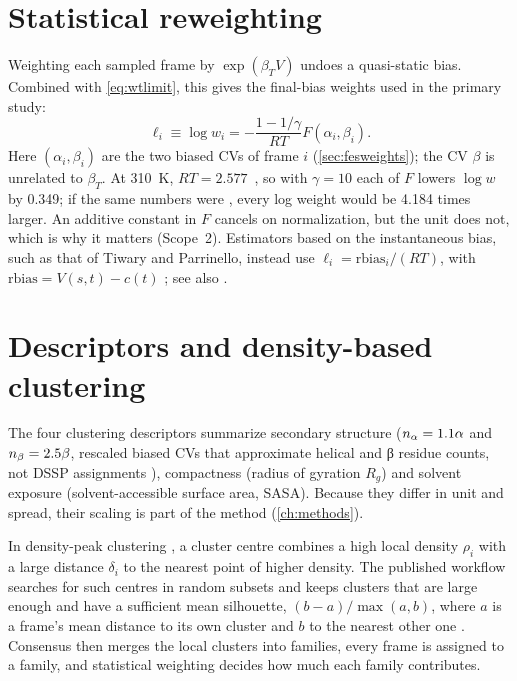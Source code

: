 \section{Statistical reweighting}
\label{sec:reweighting}
Weighting each sampled frame by $\exp(\beta_T V)$ undoes a quasi-static bias. Combined with \cref{eq:wtlimit}, this gives the final-bias weights used in the primary study:
\begin{equation}
\ell_i\equiv\log w_i=-\frac{1-1/\gamma}{RT}F(\alpha_i,\beta_i).
\label{eq:finalweights}
\end{equation}
Here $(\alpha_i,\beta_i)$ are the two biased CVs of frame $i$ (\cref{sec:fesweights}); the CV $\beta$ is unrelated to $\beta_T$. At 310~K, $RT=2.577$~\kJmol{}, so with $\gamma=10$ each \kJmol{} of $F$ lowers $\log w$ by 0.349; if the same numbers were \kcalmol{}, every log weight would be 4.184 times larger. An additive constant in $F$ cancels on normalization, but the unit does not, which is why it matters (Scope~2). Estimators based on the instantaneous bias, such as that of Tiwary and Parrinello, instead use $\ell_i=\mathrm{rbias}_i/(RT)$, with $\mathrm{rbias}=V(s,t)-c(t)$ \autocite{tiwary2015,plumedreweight}; see also \textcite{bonomi2009}.

\section{Descriptors and density-based clustering}
The four clustering descriptors summarize secondary structure ($n_{\alpha}=1.1\alpha$ and $n_{\beta}=2.5\beta$, rescaled biased CVs that approximate helical and β residue counts, not DSSP assignments \autocite{kabsch1983}), compactness (radius of gyration $R_g$) and solvent exposure (solvent-accessible surface area, SASA). Because they differ in unit and spread, their scaling is part of the method (\cref{ch:methods}).

In density-peak clustering \autocite{rodriguez2014}, a cluster centre combines a high local density $\rho_i$ with a large distance $\delta_i$ to the nearest point of higher density. The published workflow searches for such centres in random subsets and keeps clusters that are large enough and have a sufficient mean silhouette, $(b-a)/\max(a,b)$, where $a$ is a frame's mean distance to its own cluster and $b$ to the nearest other one \autocite{cadenelli2026,rousseeuw1987}. Consensus then merges the local clusters into families, every frame is assigned to a family, and statistical weighting decides how much each family contributes.
